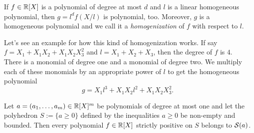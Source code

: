 If $f \in \mathbb{R}[X]$ is a polynomial of degree at most $d$ and $l$ is a linear homogeneous polynomial, then $g = l^d f (X/l)$ is polynomial, too. Moreover, $g$ is a homogeneous polynomial and we call it a \emph{homogenization} of $f$ with respect to $l$.

Let's see an example for how this kind of homogenization works. If  say $f = X_1 + X_1 X_2 + X_1 X_2 X_3^2$ and $l=X_1 + X_2 +X_3$, then the degree of $f$ is $4$. There is a monomial of degree one and a monomial of degree two. We multiply each of these monomials by an appropriate power of $l$ to get the homogeneous polynomial
\[
	g = X_1 l^3 + X_1 X_2 l^2 + X_1 X_2 X_3^2. 
\]

\begin{theorem}
	Let $a = (a_1,\ldots,a_m) \in \mathbb{R}[X]^m$ be polynomials of degree at most one and let the polyhedron $S:= \{a \ge 0\}$ defined by the inequalities $a \ge 0$ be non-empty and bounded. Then every polynomial $f \in \mathbb{R}[X]$ strictly positive on $S$ belongs to $\mathcal{S}(a)$. 
\end{theorem}
